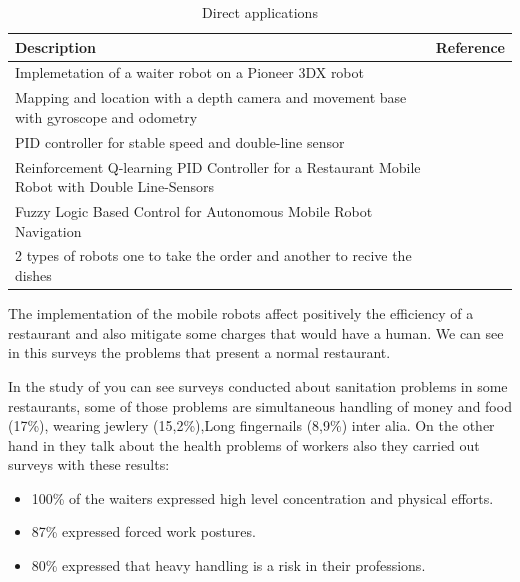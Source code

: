 \begin{table}[h!]
\caption{Direct applications}
\begin{centering}
\begin{tabular}{>{\centering}p{7cm}>{\centering}p{4cm}}
\hline 
\raggedright{}Description & \raggedright{}Reference\tabularnewline
\hline 
\raggedright{Implemetation of a waiter robot on a Pioneer 3DX robot} & \raggedright{}\citep{escudero2012robot}\tabularnewline
\hline 
\raggedright{}Mapping and location with a depth camera and movement base with gyroscope and odometry & \raggedright{}\citep{zhang2016approach}\tabularnewline
\hline 
\raggedright{}PID controller for stable speed and double-line sensor& \raggedright{}\citep{thanh2019restaurant}\tabularnewline
\hline 
\raggedright{}Reinforcement Q-learning PID Controller for a Restaurant Mobile Robot with Double Line-Sensors & \raggedright{}\citep{thanh2020reinforcement}\tabularnewline
\hline 
\raggedright{}Fuzzy Logic Based Control for Autonomous Mobile Robot Navigation& \raggedright{}\citep{omrane2016fuzzy}\tabularnewline
\hline 
\raggedright{}2 types of robots one to take the order and another to recive the dishes & \raggedright{}\citep{eksiri2015restaurant}\tabularnewline
\hline 
\end{tabular}
\par\end{centering}
\end{table}
\newpage

The implementation of the mobile robots affect positively the efficiency of a restaurant and also mitigate some charges that would have a human. We can see in this surveys the problems that present a normal restaurant.


In the study of \citep{florez2011factores} you can see surveys conducted about sanitation problems in some restaurants, some of those problems are simultaneous handling of money and food (17\%), wearing jewlery (15,2\%),Long fingernails (8,9\%) inter alia. On the other hand in \citep{armendariz2012riesgos} they talk about the health problems of workers also they carried out surveys with these results:

\begin{itemize}
\item 100\% of the waiters expressed high level concentration and physical efforts.
\item 87\% expressed forced work postures.
 
\item 80\% expressed that heavy handling is a risk in their professions.

\end{itemize}


